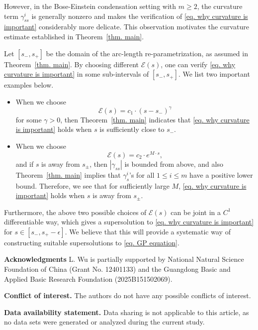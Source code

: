\documentclass[11pt,twoside,reqno]{amsart}
\newcounter{assu}
\numberwithin{equation}{section}
\begin{document}
However, in the Bose-Einstein condensation setting with $m\geq2$, the curvature term $\gamma^i_{ss}$ is generally nonzero and makes the verification of \eqref{eq. why curvature is important} considerably more delicate. This observation motivates the curvature estimate established in Theorem~\ref{thm. main}.



Let $[s_{-},s_{+}]$ be the domain of the arc-length re-parametrization, as assumed in Theorem~\ref{thm. main}. By choosing different $\mathcal{E}(s)$, one can verify \eqref{eq. why curvature is important} in some sub-intervals of $[s_{-},s_{+}]$. We list two important examples below.
\begin{itemize}
    \item[(1)] When we choose $$\mathcal{E}(s)=c_{1}\cdot(s-s_{-})^{\gamma}$$ for some $\gamma>0$, then Theorem~\ref{thm. main} indicates that \eqref{eq. why curvature is important} holds when $s$ is sufficiently close to $s_{-}$.
    \item[(2)] When we choose $$\mathcal{E}(s)=c_{2}\cdot e^{M\cdot s},$$ and if $s$ is away from $s_{\pm}$, then $|\gamma_{ss}|$ is bounded from above, and also Theorem~\ref{thm. main} implies that $\gamma^{i}_{s}$'s for all $1\leq i\leq m$ have a positive lower bound. Therefore, we see that for sufficiently large $M$, \eqref{eq. why curvature is important} holds when $s$ is away from $s_{\pm}$.
\end{itemize}
Furthermore, the above two possible choices of $\mathcal{E}(s)$ can be joint in a $C^{1}$ differentiable way, which gives a supersolution to \eqref{eq. why curvature is important} for $s\in[s_{-},s_{+}-\epsilon]$. We believe that this will provide a systematic way of constructing suitable supersolutions to \eqref{eq. GP equation}.


\noindent \textbf{Acknowledgments} 
L. Wu is partially supported by National Natural Science Foundation of China (Grant No. 12401133) and the Guangdong Basic and Applied Basic Research Foundation (2025B151502069).

\vspace{2mm}

\noindent \textbf{Conflict of interest.} The authors do not have any possible conflicts of interest.


\vspace{2mm}


\noindent \textbf{Data availability statement.}
 Data sharing is not applicable to this article, as no data sets were generated or analyzed during the current study.









%


%
\end{document}
